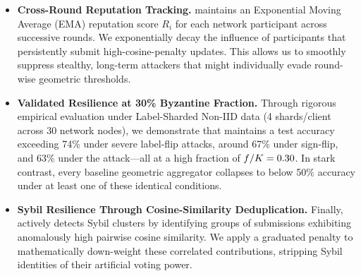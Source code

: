 \documentclass[../main.tex]{subfiles}
\begin{document}
\begin{itemize}
    \item \textbf{Cross-Round Reputation Tracking.}
    \aegis{} maintains an Exponential Moving Average (EMA) reputation score $R_i$ for each network participant across successive rounds. We exponentially decay the influence of participants that persistently submit high-cosine-penalty updates. This allows us to smoothly suppress stealthy, long-term attackers that might individually evade round-wise geometric thresholds.

    \item \textbf{Validated Resilience at 30\% Byzantine Fraction.}
    Through rigorous empirical evaluation under Label-Sharded Non-IID data (4 shards/client across 30 network nodes), we demonstrate that \aegis{} maintains a test accuracy exceeding 74\% under severe label-flip attacks, around 67\% under sign-flip, and 63\% under the \ipm{} attack---all at a high \byz{} fraction of $f/K = 0.30$. In stark contrast, every baseline geometric aggregator collapses to below 50\% accuracy under at least one of these identical conditions.

    \item \textbf{Sybil Resilience Through Cosine-Similarity Deduplication.}
    Finally, \aegis{} actively detects Sybil clusters by identifying groups of submissions exhibiting anomalously high pairwise cosine similarity. We apply a graduated penalty \citep{fung2020limitations} to mathematically down-weight these correlated contributions, stripping Sybil identities of their artificial voting power.

\end{itemize}
\end{document}

